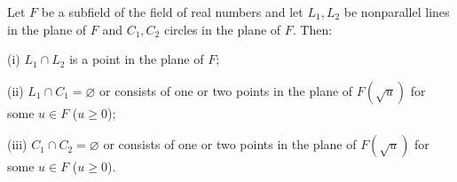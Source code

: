 Let $F$ be a subfield of the field of real numbers and let $L_1, L_2$ be nonparallel lines in the plane of $F$ and $C_1, C_2$ circles in the plane of $F$. Then:

(i) $L_1 \cap L_2$ is a point in the plane of $F$;

(ii) $L_1 \cap C_1 = \varnothing$ or consists of one or two points in the plane of $F(\sqrt{u})$ for some $u \in F$ ($u \geq 0$);

(iii) $C_1 \cap C_2 = \varnothing$ or consists of one or two points in the plane of $F(\sqrt{u})$ for some $u \in F$ ($u \geq 0$).
